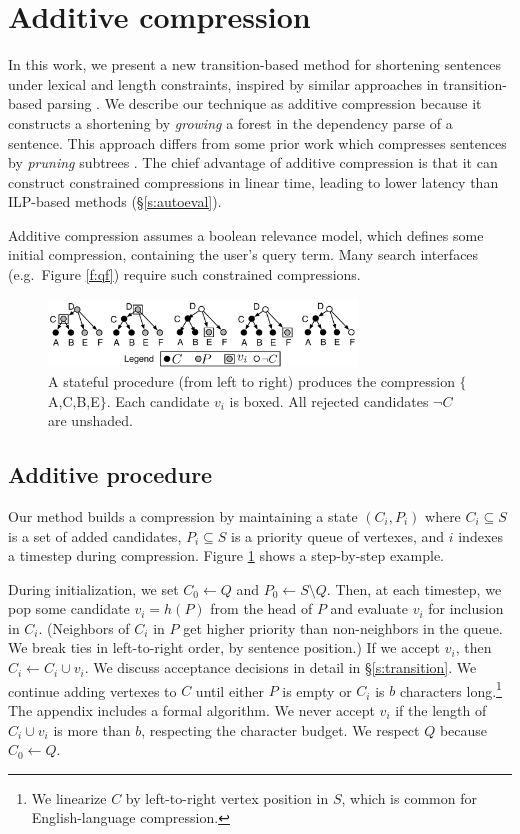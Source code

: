 \documentclass[11pt,a4paper]{article}
\begin{document}
\section{Additive compression}\label{s:system}

In this work, we present a new transition-based method for shortening sentences under lexical and length constraints, inspired by similar approaches in transition-based parsing \cite{nivre2003}. We describe our technique as additive compression because it constructs a shortening by \textit{growing} a forest in the dependency parse of a sentence. This approach differs from some prior work which
compresses sentences by \textit{pruning} subtrees \cite{Knight2000StatisticsBasedS,berg2011jointly,almeida2013fast,Filippova2015FastKS}. The chief advantage of additive compression is that it can construct constrained compressions in linear time, leading to lower latency than ILP-based methods (\S\ref{s:autoeval}). 

Additive compression assumes a boolean relevance model, which defines some initial compression, containing the user's query term. Many search interfaces (e.g.\ Figure \ref{f:qf}) require such constrained compressions.


\begin{figure}[h]
\includegraphics[width=8.2cm]{additive.pdf}
\caption{A stateful procedure (from left to right) produces the compression $\{$A,C,B,E$\}$. Each candidate $v_i$ is boxed. All rejected candidates $\neg C$ are unshaded.}
\label{f:walkthru}
\end{figure}

\subsection{Additive procedure}\label{s:formal}

Our method builds a compression by maintaining a state
$(C_i,P_i)$ where $C_i \subseteq S$ is a set of added candidates, $P_i  \subseteq S$ is a priority queue of vertexes, and $i$ indexes a timestep during compression. Figure \ref{f:walkthru} shows a step-by-step example. 

During initialization, we set $C_0 \gets Q$ and $P_0 \gets S \setminus Q$. Then, at each timestep, we pop some candidate $v_i =h(P)$ from the head of $P$ and evaluate $v_i$ for inclusion in $C_i$. (Neighbors of $C_i$ in $P$ get higher priority than non-neighbors in the queue. We break ties in left-to-right order, by sentence position.) If we accept $v_i$, then $C_i \gets C_i \cup v_i$. We discuss acceptance decisions in detail in \S\ref{s:transition}. We continue adding vertexes to $C$ until either $P$ is empty or $C_i$ is $b$ characters long.\footnote{We linearize $C$ by left-to-right vertex position in $S$, which is common for English-language compression.} The appendix includes a formal algorithm. We never accept $v_i$ if the length of $C_i \cup v_i$ is more than $b$, respecting the character budget. We respect $Q$ because $C_0 \gets Q$. 
\end{document}
